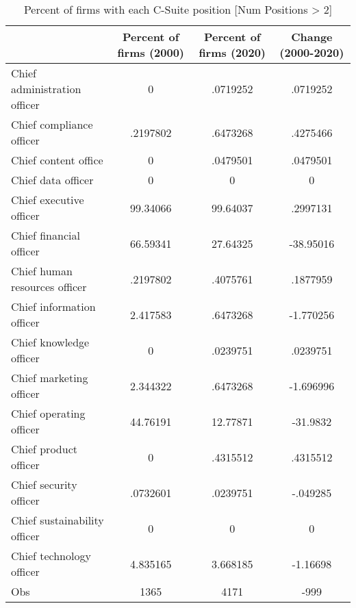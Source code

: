 \begin{table}[htbp]\centering
\caption{Percent of firms with each C-Suite position [Num Positions > 2]\label{tab98}}
\begin{tabular}{l*{3}{c}}
\toprule
                    &Percent of firms (2000)&Percent of firms (2020)&Change (2000-2020)\\
\midrule
Chief administration officer&           0&    .0719252&    .0719252\\
Chief compliance officer&    .2197802&    .6473268&    .4275466\\
Chief content office&           0&    .0479501&    .0479501\\
Chief data officer  &           0&           0&           0\\
Chief executive officer&    99.34066&    99.64037&    .2997131\\
Chief financial officer&    66.59341&    27.64325&   -38.95016\\
Chief human resources officer&    .2197802&    .4075761&    .1877959\\
Chief information officer&    2.417583&    .6473268&   -1.770256\\
Chief knowledge officer&           0&    .0239751&    .0239751\\
Chief marketing officer&    2.344322&    .6473268&   -1.696996\\
Chief operating officer&    44.76191&    12.77871&    -31.9832\\
Chief product officer&           0&    .4315512&    .4315512\\
Chief security officer&    .0732601&    .0239751&    -.049285\\
Chief sustainability officer&           0&           0&           0\\
Chief technology officer&    4.835165&    3.668185&    -1.16698\\
Obs                 &        1365&        4171&        -999\\
\bottomrule
\end{tabular}
\end{table}
